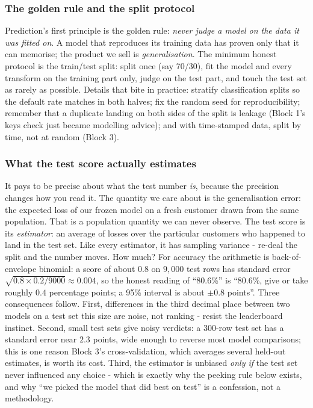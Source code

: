 \documentclass[11pt,a4paper]{article}
\begin{document}
\subsubsection{The golden rule and the split protocol}
Prediction's first principle is the golden rule: \emph{never judge a model
on the data it was fitted on}. A model that reproduces its training data
has proven only that it can memorise; the product we sell is
\emph{generalisation}. The minimum honest protocol is the train/test split:
split once (say 70/30), fit the model and every transform on the training
part only, judge on the test part, and touch the test set as rarely as
possible. Details that bite in practice: stratify classification splits so
the default rate matches in both halves; fix the random seed for
reproducibility; remember that a duplicate landing on both sides of the
split is leakage (Block 1's keys check just became modelling advice); and
with time-stamped data, split by time, not at random (Block 3).

\subsubsection{What the test score actually estimates}
It pays to be precise about what the test number \emph{is}, because the
precision changes how you read it. The quantity we care about is the
generalisation error: the expected loss of our frozen model on a fresh
customer drawn from the same population. That is a population quantity we
can never observe. The test score is its \emph{estimator}: an average of
losses over the particular customers who happened to land in the test
set. Like every estimator, it has sampling variance - re-deal the split
and the number moves. How much? For accuracy the arithmetic is
back-of-envelope binomial: a score of about $0.8$ on $9{,}000$ test rows
has standard error $\sqrt{0.8 \times 0.2 / 9000} \approx 0.004$, so the
honest reading of ``80.6\%'' is ``80.6\%, give or take roughly $0.4$
percentage points; a 95\% interval is about $\pm 0.8$ points''. Three
consequences follow. First, differences in the third decimal place
between two models on a test set this size are noise, not ranking -
resist the leaderboard instinct. Second, small test sets give noisy
verdicts: a 300-row test set has a standard error near $2.3$ points, wide
enough to reverse most model comparisons; this is one reason Block 3's
cross-validation, which averages several held-out estimates, is worth
its cost. Third, the estimator is unbiased \emph{only if} the test set
never influenced any choice - which is exactly why the peeking rule
below exists, and why ``we picked the model that did best on test'' is a
confession, not a methodology.
\end{document}

